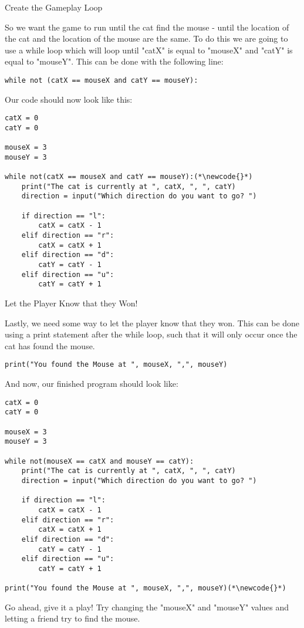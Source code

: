 \documentclass[12pt,oneside]{article}
\newcommand{\subsectitle}[1]{
  \begin{flushleft}{\large#1}\end{flushleft}
}
\newcommand{\newcode}[0]{\hfill<--}
\begin{document}
\begin{samepage}
\subsectitle{Create the Gameplay Loop}
So we want the game to run until the cat find the mouse - until the location of the cat and the location of the mouse are the same. To do this we are going to use a while loop which will loop until "catX" is equal to "mouseX" and "catY" is equal to "mouseY". This can be done with the following line:

\begin{lstlisting}
while not (catX == mouseX and catY == mouseY):
\end{lstlisting}

Our code should now look like this:

\begin{lstlisting}
catX = 0
catY = 0

mouseX = 3
mouseY = 3

while not(catX == mouseX and catY == mouseY):(*\newcode{}*)
    print("The cat is currently at ", catX, ", ", catY)
    direction = input("Which direction do you want to go? ")
    
    if direction == "l":
        catX = catX - 1
    elif direction == "r":
        catX = catX + 1
    elif direction == "d":
        catY = catY - 1
    elif direction == "u":
        catY = catY + 1
\end{lstlisting}
\end{samepage}

\begin{samepage}
\subsectitle{Let the Player Know that they Won!}

Lastly, we need some way to let the player know that they won. This can be done using a print statement after the while loop, such that it will only occur once the cat has found the mouse.

\begin{lstlisting}
print("You found the Mouse at ", mouseX, ",", mouseY)
\end{lstlisting}

And now, our finished program should look like:

\begin{lstlisting}
catX = 0
catY = 0

mouseX = 3
mouseY = 3

while not(mouseX == catX and mouseY == catY):
    print("The cat is currently at ", catX, ", ", catY)
    direction = input("Which direction do you want to go? ")
    
    if direction == "l":
        catX = catX - 1
    elif direction == "r":
        catX = catX + 1
    elif direction == "d":
        catY = catY - 1
    elif direction == "u":
        catY = catY + 1

print("You found the Mouse at ", mouseX, ",", mouseY)(*\newcode{}*)
\end{lstlisting}

Go ahead, give it a play! Try changing the "mouseX" and "mouseY" values and letting a friend try to find the mouse.
\end{samepage}
\end{document}
